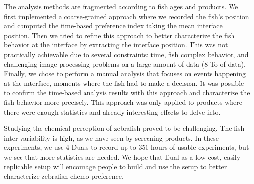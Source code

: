   The analysis methods are fragmented according to fish ages and products. We first implemented a coarse-grained approach where we recorded the fish's position and computed the time-based preference index taking the mean interface position. Then we tried to refine this approach to better characterize the fish behavior at the interface by extracting the interface position. This was not practically achievable due to several constraints: time, fish complex behavior, and challenging image processing problems on a large amount of data (8 To of data). Finally, we chose to perform a manual analysis that focuses on events happening at the interface, moments where the fish had to make a decision. It was possible to confirm the time-based analysis results with this approach and characterize the fish behavior more precisely. This approach was only applied to products where there were enough statistics and already interesting effects to delve into.

 Studying the chemical perception of zebrafish proved to be challenging. The fish inter-variability is high, as we have seen by screening products. In these experiments, we use 4 Duals to record up to 350 hours of usable experiments, but we see that more statistics are needed. We hope that Dual as a low-cost, easily replicable setup will encourage people to build and use the setup to better characterize zebrafish chemo-preference.


